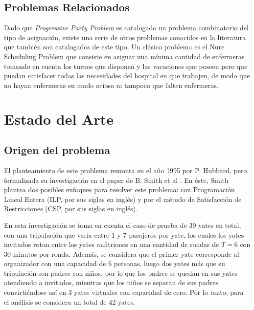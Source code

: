 \documentclass[letter, 10pt]{article}
\begin{document}
\subsection{Problemas Relacionados}

Dado que \textit{Progressive Party Problem} es catalogado un problema combinatorio\cite{Hooker1999395} del tipo de asignación, existe una serie de otros problemas conocidos en la literatura que también son catalogados de este tipo. Un clásico problema es el Nure Scheduling Problem que consiste en asignar una mínima cantidad de enfermeras tomando en cuenta los turnos que disponen y las vacaciones que poseen pero que puedan satisfacer todas las necesidades del hospital en que trabajen, de modo que no hayan enfermeras en modo ocioso ni tampoco que falten enfermeras.


\section{Estado del Arte}

\subsection{Origen del problema}

El planteamiento de este problema remonta en el año 1995 por P. Hubbard, pero formalizada su investigación en el paper de B. Smith et al \cite{Smith1996}. En éste, Smith plantea dos posibles enfoques para resolver este problema: con Programación Lineal Entera (ILP, por sus siglas en inglés) y por el método de Satisfacción de Restricciones (CSP, por sus siglas en inglés). 

En esta investigación se toma en cuenta el caso de prueba de 39 yates en total, con una tripulación que varía entre 1 y 7 pasajeros por yate, los cuales los yates invitados rotan entre los yates anfitriones en una cantidad de rondas de $T=6$ con 30 minutos por ronda. Además, se considera que el primer yate corresponde al organizador con una capacidad de 6 personas, luego dos yates más que su tripulación son padres con niños, por lo que los padres se quedan en sus yates atendiendo a invitados, mientras que los niños se separan de sus padres convirtiéndose así en 3 yates virtuales con capacidad de cero. Por lo tanto, para el análisis se considera un total de 42 yates.
\end{document}
